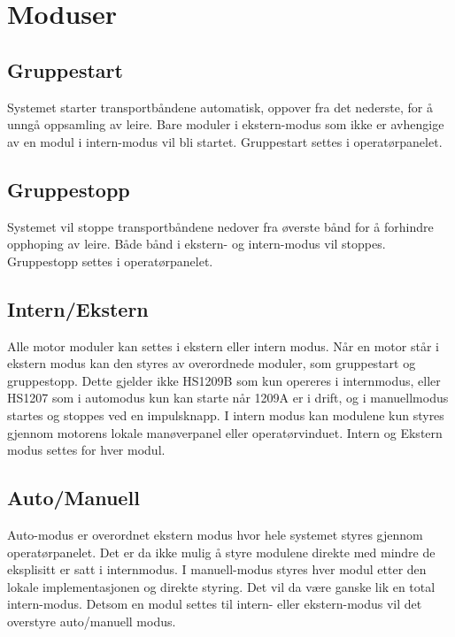 \section{Moduser}
\subsection{Gruppestart}
	Systemet starter transportbåndene automatisk, oppover fra det nederste, for å unngå oppsamling av leire. Bare moduler i ekstern-modus som ikke er avhengige av en modul i intern-modus vil bli startet. Gruppestart settes i operatørpanelet.

\subsection{Gruppestopp}
	Systemet vil stoppe transportbåndene nedover fra øverste bånd for å forhindre opphoping av leire. Både bånd i ekstern- og intern-modus vil stoppes. Gruppestopp settes i operatørpanelet.

\subsection{Intern/Ekstern}
	Alle motor moduler kan settes i ekstern eller intern modus. Når en motor står i ekstern modus kan den styres av overordnede moduler, som gruppestart og gruppestopp. Dette gjelder ikke HS1209B som kun opereres i internmodus, eller HS1207 som i automodus kun kan starte når 1209A er i drift, og i manuellmodus startes og stoppes ved en impulsknapp. I intern modus kan modulene kun styres gjennom motorens lokale manøverpanel eller operatørvinduet. Intern og Ekstern modus settes for hver modul.

\subsection{Auto/Manuell}
	Auto-modus er overordnet ekstern modus hvor hele systemet styres gjennom operatørpanelet. Det er da ikke mulig å styre modulene direkte med mindre de eksplisitt er satt i internmodus.	I manuell-modus styres hver modul etter den lokale implementasjonen og direkte styring. Det vil da være ganske lik en total intern-modus. Detsom en modul settes til intern- eller ekstern-modus vil det overstyre auto/manuell modus.
